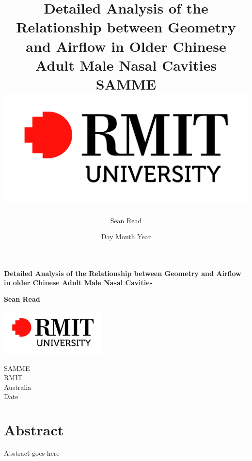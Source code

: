 \documentclass{report}
\begin{document}
\title{
	{Detailed Analysis of the Relationship between Geometry and Airflow in Older Chinese Adult Male Nasal Cavities}\\
	{\large SAMME}\\
	{\includegraphics{rmit.jpg}}
}
\author{Sean Read}
\date{Day Month Year}
\begin{titlepage}
    \begin{center}
        \vspace*{1cm}
        
        \Huge
	\textbf{Detailed Analysis of the Relationship between Geometry and Airflow in older Chinese Adult Male Nasal Cavities}
        
        \vspace{1.5cm}
        
        \textbf{Sean Read}
        
        \vfill
        
        \vspace{0.8cm}
        
        \includegraphics[width=0.4\textwidth]{rmit}
        
        \Large
        SAMME\\
        RMIT\\
        Australia\\
        Date
        
    \end{center}
\end{titlepage}

\chapter*{Abstract}
Abstract goes here
\end{document}
